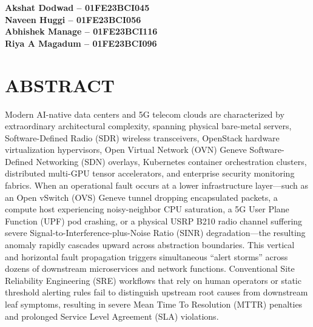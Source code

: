 \vspace{0.7cm}
\begin{flushright}
\textbf{Akshat Dodwad -- 01FE23BCI045}\\
\textbf{Naveen Huggi -- 01FE23BCI056}\\
\textbf{Abhishek Manage -- 01FE23BCI116}\\
\textbf{Riya A Magadum -- 01FE23BCI096}
\end{flushright}

\newpage

\chapter*{ABSTRACT}
\thispagestyle{plain}

Modern AI-native data centers and 5G telecom clouds are characterized by extraordinary architectural complexity, spanning physical bare-metal servers, Software-Defined Radio (SDR) wireless transceivers, OpenStack hardware virtualization hypervisors, Open Virtual Network (OVN) Geneve Software-Defined Networking (SDN) overlays, Kubernetes container orchestration clusters, distributed multi-GPU tensor accelerators, and enterprise security monitoring fabrics. When an operational fault occurs at a lower infrastructure layer---such as an Open vSwitch (OVS) Geneve tunnel dropping encapsulated packets, a compute host experiencing noisy-neighbor CPU saturation, a 5G User Plane Function (UPF) pod crashing, or a physical USRP B210 radio channel suffering severe Signal-to-Interference-plus-Noise Ratio (SINR) degradation---the resulting anomaly rapidly cascades upward across abstraction boundaries. This vertical and horizontal fault propagation triggers simultaneous ``alert storms'' across dozens of downstream microservices and network functions. Conventional Site Reliability Engineering (SRE) workflows that rely on human operators or static threshold alerting rules fail to distinguish upstream root causes from downstream leaf symptoms, resulting in severe Mean Time To Resolution (MTTR) penalties and prolonged Service Level Agreement (SLA) violations.


